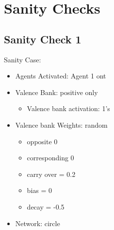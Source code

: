 \documentclass{article}\usepackage[]{graphicx}\usepackage[]{color}
\begin{document}
\newpage

\section{Sanity Checks}
\label{sec:sanity-checks}

\subsection{Sanity Check 1}
\label{sec:sanity1}
Sanity Case:
\begin{itemize}
  \item Agents Activated: Agent 1 ont
  \item Valence Bank: positive only
  \begin{itemize}
      \item Valence bank activation: 1's
  \end{itemize}
  \item Valence bank Weights: random
  \begin{itemize}
      \item opposite 0
      \item corresponding 0
      \item carry over = 0.2
      \item bias = 0
      \item decay = -0.5
  \end{itemize}
  \item Network: circle
\end{itemize}
\end{document}
